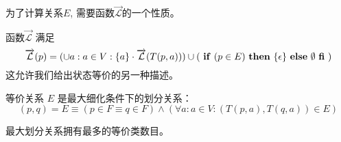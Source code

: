 为了计算关系$E$, 需要函数$\overrightarrow{\mathcal{L}}$的一个性质。

\begin{property}
    函数$\overrightarrow{\mathcal{L}}$ 满足
    \[ \overrightarrow{\mathcal{L}}(p) = (\cup a:a \in V : \{a\} \cdot \overrightarrow{\mathcal{L}}(T(p,a))) \cup ( \mbox{ \textbf{if} }   (p \in E) \mbox{ \textbf{then} }   \{\epsilon\} \mbox{ \textbf{else} }   {\emptyset  \mbox{ \textbf{fi} }}) \]
    这允许我们给出状态等价的另一种描述。
\end{property}


\begin{definition}[状态的等价]\label{def:eqstate}
    等价关系 $E$ 是最大细化条件下的划分关系：
    \[ (p,q) = E \equiv ( p \in F \equiv q \in F ) \land ( \forall a:a \in V : (T(p,a),T(q,a)) \in E ) \]
    
\end{definition}


\begin{remark}
    最大划分关系拥有最多的等价类数目。
\end{remark}


